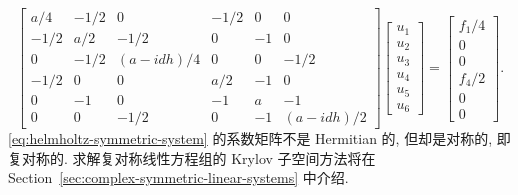 \begin{equation}\label{eq:helmholtz-symmetric-system}
\begin{bmatrix}
a/4&-1/2&0&-1/2&0&0\\-1/2&a/2&-1/2&0&-1&0\\0&-1/2&(a-idh)/4&0&0&-1/2\\
-1/2&0&0&a/2&-1&0\\0&-1&0&-1&a&-1\\0&0&-1/2&0&-1&(a-idh)/2
\end{bmatrix}
\begin{bmatrix}u_1\\u_2\\u_3\\u_4\\u_5\\u_6\end{bmatrix}
=\begin{bmatrix}f_1/4\\0\\0\\f_4/2\\0\\0\end{bmatrix}.
\end{equation}
{\eqref{eq:helmholtz-symmetric-system} 的系数矩阵不是 Hermitian 的, 但却是对称的, 即复对称的. 求解复对称线性方程组的 Krylov 子空间方法将在 Section\ \ref{sec:complex-symmetric-linear-systems} 中介绍.}
